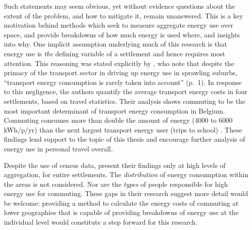 \documentclass[a4paper, 11pt, twoside]{Thesis}
\begin{document}
Such statements may seem obvious, yet without evidence questions about
the extent of the
problem, and how to mitigate it, remain unanswered. This is a key motivation
behind methods which seek to measure aggregate energy use over space, and
provide breakdowns of how much energy is used where, and insights into why.
One implicit assumption underlying much of this research is that
energy use is \emph{the} defining
variable of a settlement and hence requires most attention.
This reasoning was stated explicitly by
\citet{Marique2012}, who note that despite the primacy of the transport sector
in driving up energy use in sprawling suburbs, ``transport energy consumption
is rarely taken into account'' (p.~1). In response to this negligence, the authors
quantify the average transport energy costs in four settlements, based on travel
statistics. Their analysis shows commuting to be the most
important determinant of transport energy consumption in Belgium. Commuting
consumes more than double the amount of energy (4000 to 6000 kWh/p/yr) 
than the next largest transport energy user (trips to school)
\citep{Marique2012}. These findings lend support to the topic of this thesis and
encourage further analysis of energy use in personal travel overall.

Despite the use of census data, \citet{Marique2012} present their findings only
at high levels of aggregation, for entire settlements. The \emph{distribution}
of energy consumption within the areas is not considered. Nor are the
\emph{types} of people responsible for high energy use for commuting. These
gaps in their research suggest more detail would be welcome: providing a method
to calculate the energy costs of commuting at lower geographies that is capable
of providing breakdowns of energy use at the individual level would constitute
a step forward for this research.
\end{document}
